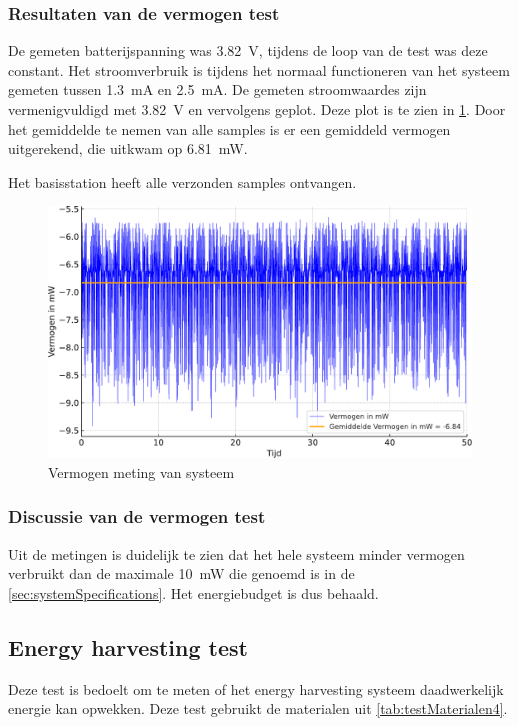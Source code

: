 \subsubsection{Resultaten van de vermogen test} \label{sec:vermogenTestResults}
De gemeten batterijspanning was \qty{3.82}{\volt}, tijdens de loop van de test was deze constant. Het stroomverbruik is tijdens het normaal functioneren van het systeem gemeten tussen \qty{1.3}{\milli\ampere} en \qty{2.5}{\milli\ampere}. De gemeten stroomwaardes zijn vermenigvuldigd met \qty{3.82}{\volt} en vervolgens geplot. Deze plot is te zien in \cref{fig:vermogenMeting}. Door het gemiddelde te nemen van alle samples is er een gemiddeld vermogen uitgerekend, die uitkwam op \qty{6.81}{\milli\watt}.

Het basisstation heeft alle verzonden samples ontvangen.


\begin{figure}[!htbp]
    \centering
    \includegraphics[width=.85\textwidth]{img/vermogensMeting.pdf}
    \caption{Vermogen meting van systeem}
    \label{fig:vermogenMeting}
\end{figure}

\subsubsection{Discussie van de vermogen test}
Uit de metingen is duidelijk te zien dat het hele systeem minder vermogen verbruikt dan de maximale \qty{10}{\milli\watt} die genoemd is in de \cref{sec:systemSpecifications}. Het energiebudget is dus behaald.


\subsection{Energy harvesting test}\label{sec:harvestTest}
Deze test is bedoelt om te meten of het energy harvesting systeem daadwerkelijk energie kan opwekken. Deze test gebruikt de materialen uit \cref{tab:testMaterialen4}.

